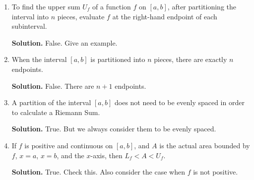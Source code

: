 \documentclass[12pt]{article}
\begin{document}
\begin{enumerate}
	\begin{enumerate}
	\item To find the upper sum $U_f$ of a function $f$ on $[a, b]$, after partitioning the interval into
$n$ pieces, evaluate $f$ at the right-hand endpoint of each subinterval.

	{\bf Solution. }False. Give an example. 

	\item When the interval $[a, b]$ is partitioned into $n$ pieces, there are exactly $n$ endpoints.

	{\bf Solution. } False. There are $n+1$ endpoints.

	\item A partition of the interval $[a, b]$ does not need to be evenly spaced in order to calculate
a Riemann Sum.

	{\bf Solution. } True. But we always consider them to be evenly spaced.

	\item If $f$ is positive and continuous on $[a, b]$, and $A$ is the actual area bounded by $f$, $x = a$,
$x = b$, and the $x$-axis, then $L_f < A < U_f$.

	{\bf Solution.} True. Check this. Also consider the case when $f$ is not positive.
	\end{enumerate}
\end{enumerate}
\end{document}
